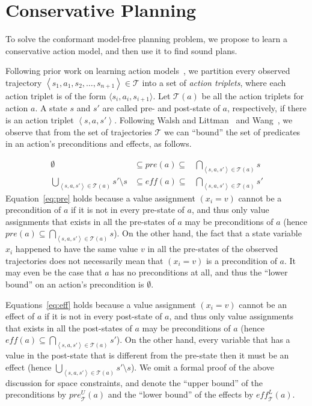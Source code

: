 \documentclass[letterpaper]{article}
\newcommand{\tuple}[1]{\ensuremath{\left \langle #1 \right \rangle }}
\newcommand{\eff}{\textit{eff}}
\newcommand{\pre}{\textit{pre}}
\begin{document}
\section{Conservative Planning}
To solve the conformant model-free planning problem, we propose to learn a conservative action model, and then use it to find sound plans.

Following prior work on learning action models~\cite{wang1995learning,wang1994learning,walsh2008efficientLearning}, we partition every observed trajectory $\tuple{s_1,a_1,s_2,\ldots,s_{n+1}}\in\mathcal{T}$ into a set of {\em action triplets}, where each action triplet is of the form $\langle s_i, a_i, s_{i+1}\rangle$. 
    Let $\mathcal{T}(a)$ be all the action triplets for action $a$. 
    A state $s$ and $s'$ are called pre- and post-state of $a$, respectively, if there is an action triplet $\tuple{s,a,s'}$. Following Walsh and Littman~ and Wang~, we observe that from the set of trajectories $\mathcal{T}$ we can ``bound'' the set of predicates in an action's preconditions and effects, as follows. 
    
    \begin{align}
     \emptyset & \subseteq \pre(a) \subseteq & \bigcap_{\tuple{s, a, s'}\in \mathcal{T}(a)} s \label{eq:pre} \\
     \bigcup_{\tuple{s, a, s'}\in \mathcal{T}(a)} s'\setminus s &
     \subseteq \eff(a) \subseteq &
     \bigcap_{\tuple{s, a, s'}\in \mathcal{T}(a)} s'
      \label{eq:eff}
    \end{align}
    Equation~\ref{eq:pre} holds because a value assignment $(x_i=v)$ cannot be a precondition of $a$ if it is not in every pre-state of $a$, and thus only value assignments that 
    exists in all the pre-states of $a$ may be preconditions of $a$ (hence $\pre(a)\subseteq \bigcap_{\tuple{s, a, s'}\in \mathcal{T}(a)} s$).     On the other hand, the fact that a state variable $x_i$ happened to have the same value $v$ in all the pre-states of the observed trajectories does not necessarily mean that $(x_i=v)$ is a precondition of $a$. It may even be the case that $a$ has no preconditions at all, and thus the ``lower bound'' on an action's precondition is $\emptyset$. 
    
    Equations~\ref{eq:eff} holds because a value assignment $(x_i=v)$ cannot be an effect of $a$ if it is not in every post-state of $a$, and thus only value assignments that 
    exists in all the post-states of $a$ may be preconditions of $a$ (hence $\eff(a)\subseteq \bigcap_{\tuple{s, a, s'}\in \mathcal{T}(a)} s'$). On the other hand, every variable that has a value in the post-state that is different from the pre-state then it must be an effect (hence $\bigcup_{\tuple{s, a, s'}\in \mathcal{T}(a)} s'\setminus s$).
    We omit a formal proof of the above discussion for space constraints, 
    and denote the ``upper bound'' of the preconditions by $\pre_\mathcal{T}^U(a)$ 
    and the ``lower bound'' of the effects by $\eff_\mathcal{T}^L(a)$. 
    
\end{document}
